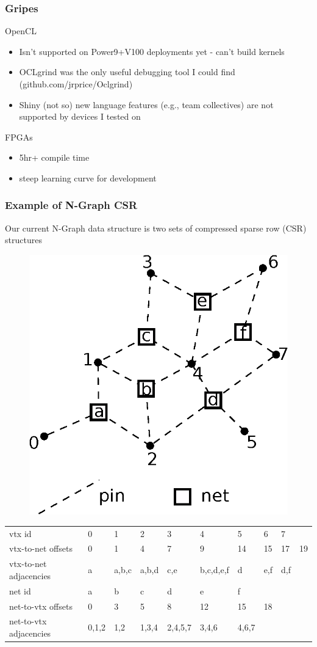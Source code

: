 \documentclass{beamer}
\begin{document}
\begin{frame}
  \frametitle{Gripes}
  OpenCL 
  \begin{itemize}
    \item Isn't supported on Power9+V100 deployments yet - can't build kernels
    \item OCLgrind was the only useful debugging tool I could find (github.com/jrprice/Oclgrind)
    \item Shiny (not so) new language features (e.g., team collectives) are not supported by devices I tested on
  \end{itemize}
  FPGAs
  \begin{itemize}
    \item 5hr+ compile time
    \item steep learning curve for development
  \end{itemize}
\end{frame}

\begin{frame}
  \frametitle{Example of N-Graph CSR}
  Our current N-Graph data structure is two sets of compressed sparse row (CSR)
  structures
  \begin{figure}
    \centering
    \includegraphics[width=.4\textwidth]{figures/hypergraph.eps}
  \end{figure}  
  {\tiny
  \begin{table}[]
    \centering
    \label{my-label}
    \begin{tabular}{llllllllll}
      vtx id                 & 0     & 1     & 2     & 3       & 4         & 5     & 6   & 7   &    \\
      vtx-to-net offsets     & 0     & 1     & 4     & 7       & 9         & 14    & 15  & 17  & 19 \\
      vtx-to-net adjacencies & a     & a,b,c & a,b,d & c,e     & b,c,d,e,f & d     & e,f & d,f &    \\
      \hline
      net id                 & a     & b     & c     & d       & e         & f     &     &     &    \\
      net-to-vtx offsets     & 0     & 3     & 5     & 8       & 12        & 15    & 18  &     &    \\
      net-to-vtx adjacencies & 0,1,2 & 1,2   & 1,3,4 & 2,4,5,7 & 3,4,6     & 4,6,7 &     &     &   
    \end{tabular}
  \end{table}
  }
\end{frame}
\end{document}
